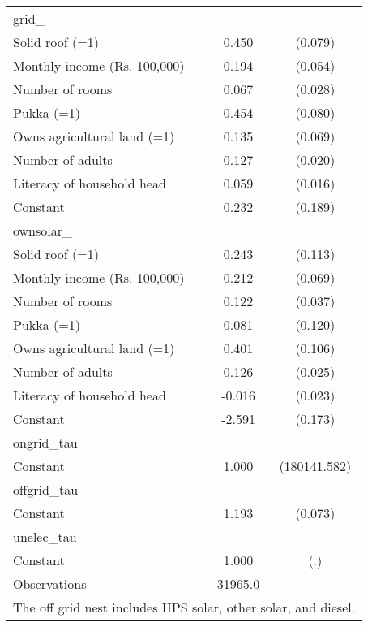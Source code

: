 \begin{table}[htbp]
\begin{tabular}{l*{1}{cc}}
\midrule
grid\_               &                     &            \\
Solid roof (=1)     &       0.450\sym{***}&     (0.079)\\
Monthly income (Rs. 100,000)&       0.194\sym{***}&     (0.054)\\
Number of rooms     &       0.067\sym{**} &     (0.028)\\
Pukka (=1)          &       0.454\sym{***}&     (0.080)\\
Owns agricultural land (=1)&       0.135\sym{**} &     (0.069)\\
Number of adults    &       0.127\sym{***}&     (0.020)\\
Literacy of household head&       0.059\sym{***}&     (0.016)\\
Constant            &       0.232         &     (0.189)\\
\midrule
ownsolar\_           &                     &            \\
Solid roof (=1)     &       0.243\sym{**} &     (0.113)\\
Monthly income (Rs. 100,000)&       0.212\sym{***}&     (0.069)\\
Number of rooms     &       0.122\sym{***}&     (0.037)\\
Pukka (=1)          &       0.081         &     (0.120)\\
Owns agricultural land (=1)&       0.401\sym{***}&     (0.106)\\
Number of adults    &       0.126\sym{***}&     (0.025)\\
Literacy of household head&      -0.016         &     (0.023)\\
Constant            &      -2.591\sym{***}&     (0.173)\\
\midrule
ongrid\_tau          &                     &            \\
Constant            &       1.000         &(180141.582)\\
\midrule
offgrid\_tau         &                     &            \\
Constant            &       1.193\sym{***}&     (0.073)\\
\midrule
unelec\_tau          &                     &            \\
Constant            &       1.000         &         (.)\\
\midrule
Observations        &     31965.0         &            \\
\bottomrule
\multicolumn{3}{l}{\footnotesize The off grid nest includes HPS solar, other solar, and diesel.}\\
\end{tabular}
\end{table}

